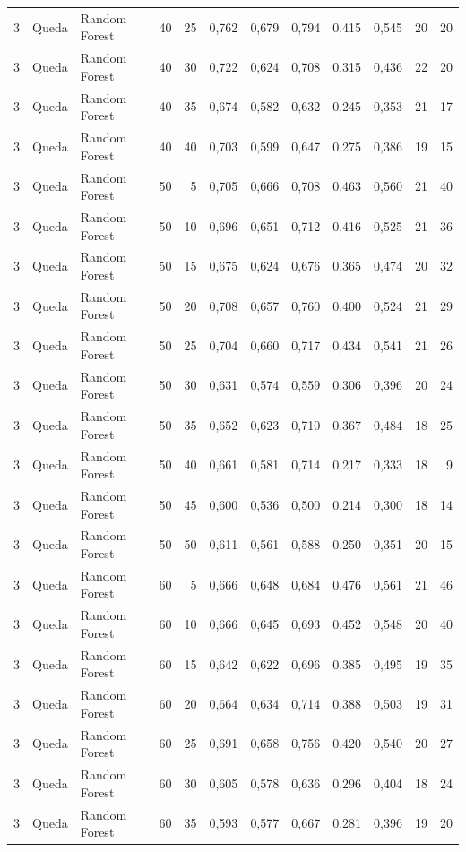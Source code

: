 \begin{longtable}{@{}rllrrrrrrrrr@{}}
3 & Queda & Random Forest & 40 & 25 & 0,762 & 0,679 & 0,794 & 0,415 & 0,545 & 20 & 20 \\
3 & Queda & Random Forest & 40 & 30 & 0,722 & 0,624 & 0,708 & 0,315 & 0,436 & 22 & 20 \\
3 & Queda & Random Forest & 40 & 35 & 0,674 & 0,582 & 0,632 & 0,245 & 0,353 & 21 & 17 \\
3 & Queda & Random Forest & 40 & 40 & 0,703 & 0,599 & 0,647 & 0,275 & 0,386 & 19 & 15 \\
3 & Queda & Random Forest & 50 & 5 & 0,705 & 0,666 & 0,708 & 0,463 & 0,560 & 21 & 40 \\
3 & Queda & Random Forest & 50 & 10 & 0,696 & 0,651 & 0,712 & 0,416 & 0,525 & 21 & 36 \\
3 & Queda & Random Forest & 50 & 15 & 0,675 & 0,624 & 0,676 & 0,365 & 0,474 & 20 & 32 \\
3 & Queda & Random Forest & 50 & 20 & 0,708 & 0,657 & 0,760 & 0,400 & 0,524 & 21 & 29 \\
3 & Queda & Random Forest & 50 & 25 & 0,704 & 0,660 & 0,717 & 0,434 & 0,541 & 21 & 26 \\
3 & Queda & Random Forest & 50 & 30 & 0,631 & 0,574 & 0,559 & 0,306 & 0,396 & 20 & 24 \\
3 & Queda & Random Forest & 50 & 35 & 0,652 & 0,623 & 0,710 & 0,367 & 0,484 & 18 & 25 \\
3 & Queda & Random Forest & 50 & 40 & 0,661 & 0,581 & 0,714 & 0,217 & 0,333 & 18 & 9 \\
3 & Queda & Random Forest & 50 & 45 & 0,600 & 0,536 & 0,500 & 0,214 & 0,300 & 18 & 14 \\
3 & Queda & Random Forest & 50 & 50 & 0,611 & 0,561 & 0,588 & 0,250 & 0,351 & 20 & 15 \\
3 & Queda & Random Forest & 60 & 5 & 0,666 & 0,648 & 0,684 & 0,476 & 0,561 & 21 & 46 \\
3 & Queda & Random Forest & 60 & 10 & 0,666 & 0,645 & 0,693 & 0,452 & 0,548 & 20 & 40 \\
3 & Queda & Random Forest & 60 & 15 & 0,642 & 0,622 & 0,696 & 0,385 & 0,495 & 19 & 35 \\
3 & Queda & Random Forest & 60 & 20 & 0,664 & 0,634 & 0,714 & 0,388 & 0,503 & 19 & 31 \\
3 & Queda & Random Forest & 60 & 25 & 0,691 & 0,658 & 0,756 & 0,420 & 0,540 & 20 & 27 \\
3 & Queda & Random Forest & 60 & 30 & 0,605 & 0,578 & 0,636 & 0,296 & 0,404 & 18 & 24 \\
3 & Queda & Random Forest & 60 & 35 & 0,593 & 0,577 & 0,667 & 0,281 & 0,396 & 19 & 20 \\

\end{longtable}
